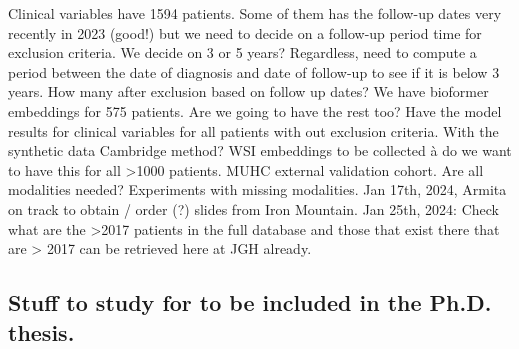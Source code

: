 \documentclass{article}%
\begin{document}
%
Clinical variables have 1594 patients. Some of them has the follow{-}up dates very recently in 2023 (good!) but we need to decide on a follow{-}up period time for exclusion criteria. We decide on 3 or 5 years? Regardless, need to compute a period between the date of diagnosis and date of follow{-}up to see if it is below 3 years. How many after exclusion based on follow up dates? %
\newline%
\newline%
%
We have bioformer embeddings for 575 patients. Are we going to have the rest too? %
\newline%
\newline%
%
Have the model results for clinical variables for all patients with out exclusion criteria. %
\newline%
\newline%
%
With the synthetic data Cambridge method?%
\newline%
\newline%
%
WSI embeddings to be collected à do we want to have this for all >1000 patients. %
\newline%
\newline%
%
MUHC external validation cohort. Are all modalities needed? Experiments with missing modalities. %
\newline%
\newline%
%
Jan 17th, 2024, Armita on track to obtain / order (?) slides from Iron Mountain.%
\newline%
\newline%
%
Jan 25th, 2024: Check what are the >2017 patients in the full database and those that exist there that are > 2017 can be retrieved here at JGH already. %
\newline%
\newline%
%
\subsection{Stuff to study for to be included in the Ph.D. thesis.}%
\label{subsec:StufftostudyfortobeincludedinthePh.D.thesis.}%
\end{document}
